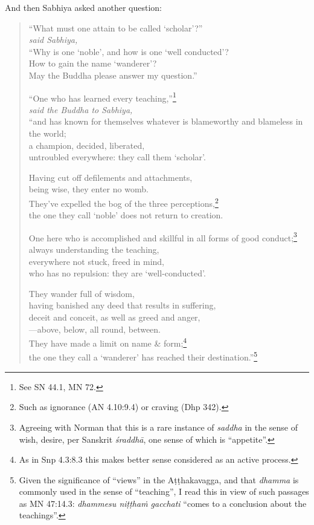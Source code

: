 \documentclass[12pt,openany]{book}%
\newcommand*{\scspeaker}[1]{\hspace{2em}\textit{#1}}
\begin{document}
And then Sabhiya asked another question: 

\begin{verse}%
“What must one attain to be called ‘scholar’?” \\
\scspeaker{said Sabhiya, }\\
“Why is one ‘noble’, and how is one ‘well conducted’? \\
How to gain the name ‘wanderer’? \\
May the Buddha please answer my question.” 

“One who has learned every teaching,”\footnote{See SN 44.1, MN 72. } \\
\scspeaker{said the Buddha to Sabhiya, }\\
“and has known for themselves whatever is blameworthy and blameless in the world; \\
a champion, decided, liberated, \\
untroubled everywhere: they call them ‘scholar’. 

Having cut off defilements and attachments, \\
being wise, they enter no womb. \\
They’ve expelled the bog of the three perceptions,\footnote{Such as ignorance (AN 4.10:9.4) or craving (Dhp 342). } \\
the one they call ‘noble’ does not return to creation. 

One here who is accomplished and skillful in all forms of good conduct;\footnote{Agreeing with Norman that this is a rare instance of \textit{saddha} in the sense of wish, desire, per Sanskrit \textit{\textsanskrit{śraddhā}}, one sense of which is “appetite”. } \\
always understanding the teaching, \\
everywhere not stuck, freed in mind, \\
who has no repulsion: they are ‘well-conducted’. 

They wander full of wisdom, \\
having banished any deed that results in suffering, \\
deceit and conceit, as well as greed and anger, \\
—above, below, all round, between. \\
They have made a limit on name \& form;\footnote{As in Snp 4.3:8.3 this makes better sense considered as an active process. } \\
the one they call a ‘wanderer’ has reached their destination.”\footnote{Given the significance of “views” in the \textsanskrit{Aṭṭhakavagga}, and that \textit{dhamma} is commonly used in the sense of “teaching”, I read this in view of such passages as MN 47:14.3: \textit{dhammesu \textsanskrit{niṭṭhaṁ} gacchati} “comes to a conclusion about the teachings”. } 

%
\end{verse}
\end{document}
